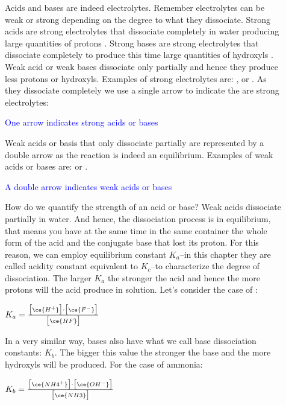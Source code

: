 \documentclass[main.tex]{subfiles}
\begin{document}
\begin{description}
\item[] Acids and bases are indeed electrolytes. Remember electrolytes can be weak or strong depending on the degree to what they dissociate. Strong acids are strong electrolytes that dissociate completely in water producing large quantities of protons . Strong bases are strong electrolytes that dissociate completely to produce this time large quantities of hydroxyls . Weak acid or weak bases dissociate only partially and hence they produce less protons or hydroxyls. Examples of strong electrolytes are: ,  or . As they dissociate completely we use a single arrow to indicate the are strong electrolytes:
\begin{center} \hspace{1cm} \textcolor{blue}{One arrow indicates strong acids or bases}\end{center}
Weak acids or basis that only dissociate partially are represented by a double arrow as the reaction is indeed an equilibrium. Examples of weak acids or bases are:  or  . 
\begin{center} \hspace{1cm} \textcolor{blue}{A double arrow indicates weak acids or bases}\end{center}
How do we quantify the strength of an acid or base? Weak acids dissociate partially in water. And hence, the dissociation process is in equilibrium, that means you have at the same time in the same container the whole form of the acid and the conjugate base that lost its proton. For this reason, we can employ equilibrium constant $K_a$--in this chapter they are called acidity constant equivalent to $K_c$--to characterize the degree of dissociation. The larger $K_a$ the stronger the acid and hence the more protons will the acid produce in solution. Let's consider the case of :
\begin{center} \hspace{1cm} $K_a=\frac{\big[ \ce{H^+} \big] \cdot \big[ \ce{F^-} \big]} {\big[ \ce{HF} \big] }$\end{center}
In a very similar way, bases also have what we call base dissociation constants: $K_b$. The bigger this value the stronger the base and the more hydroxyls will be produced. For the case of ammonia:
\begin{center} \hspace{1cm} $K_b=\frac{\big[ \ce{NH4^+} \big] \cdot \big[ \ce{OH^-} \big]} {\big[ \ce{NH3} \big] }$\end{center}

\end{description}
\end{document}
